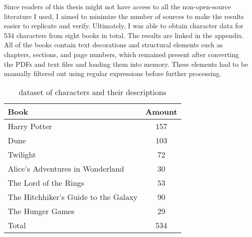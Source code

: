 Since readers of this thesis might not have access to all the non-open-source literature I used, I aimed to minimize the number of sources to make the results easier to replicate and verify. Ultimately, I was able to obtain character data for 534 characters from eight books in total. The results are linked in the appendix. All of the books contain text decorations and structural elements such as chapters, sections, and page numbers, which remained present after converting the PDFs and text files and loading them into memory. These elements had to be manually filtered out using regular expressions before further processing.\\



\begin{table}[h!]
  \centering
  \begin{tabular}{|l|c|}
  \hline
  \textbf{Book} & \textbf{Amount} \\
  \hline
  Harry Potter & 157 \\
  \hline
  Dune & 103  \\
  \hline
  Twilight & 72  \\
  \hline
  Alice's Adventures in Wonderland & 30 \\
  \hline
  The Lord of the Rings & 53 \\
  \hline
  The Hitchhiker's Guide to the Galaxy & 90 \\
  \hline
  The Hunger Games & 29 \\
  \hline
  \hline
  Total & 534 \\
  \hline
  \end{tabular}
  \caption{dataset of characters and their descriptions}
  \label{tab:example_table}
  \end{table}





